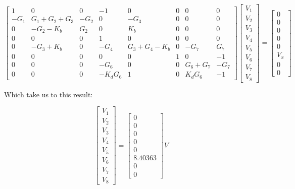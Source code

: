\begin{equation}
    \begin{bmatrix}
     1 &  0      &  0 &    -1  &     0      &  0  &  0    &  0\\
     -G_1 & G_1+G_2+G_3 & -G_2  & 0   &  -G_3       &  0  &  0    &  0\\
     0   & -G_2-K_b    & G_2  & 0   &   K_b       &  0  &  0    &  0\\
     0   & 0        & 0   & 1 & 0       &  0  & 0   & 0\\
     0   & -G_3+K_b      &  0 &  -G_4  &   G_3+G_4-K_b & 0 &  -G_7    & G_7\\
     0   & 0       & 0  &  0    & 0     & 1  & 0     & -1\\
     0   & 0        & 0  & -G_6   &  0         & 0   & G_6+G_7 & -G_7\\
     0   & 0        & 0  &  -K_dG_6    &  1         & 0   & K_dG_6     & -1
    \end{bmatrix} 
    \begin{bmatrix}
        V_1\\
        V_2\\
        V_3\\
        V_4\\
        V_5\\
        V_6\\
        V_7\\
        V_8
    \end{bmatrix}
    = 
    \begin{bmatrix}
        0\\
        0\\
        0\\
        0\\
        0\\
        V_x\\
        0\\
        0
    \end{bmatrix}
\label{eqnodos}
\end{equation}

Which take us to this result:

\begin{equation}
    \begin{bmatrix}
        V_1\\
        V_2\\
        V_3\\
        V_4\\
        V_5\\
        V_6\\
        V_7\\
        V_8
    \end{bmatrix}
    = 
    \begin{bmatrix}
        0\\
        0\\
        0\\
        0\\
        0\\
        8.40363\\
        0\\
        0
    \end{bmatrix}V
\end{equation}

